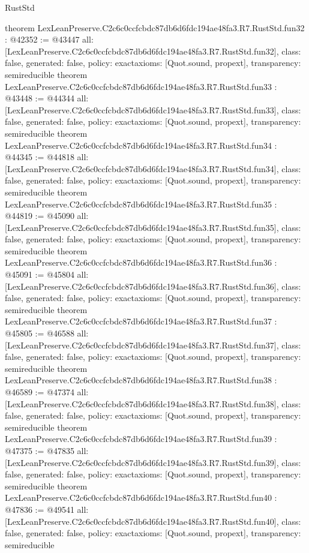 \begin{lexlean}{RustStd}
\begin{coremodule}
{}
theorem LexLeanPreserve.C2c6c0ccfcbdc87db6d6fdc194ae48fa3.R7.RustStd.fun32 : @42352 := @43447 {
  all: [LexLeanPreserve.C2c6c0ccfcbdc87db6d6fdc194ae48fa3.R7.RustStd.fun32],
  class: false,
  generated: false,
  policy: exact{axioms: [Quot.sound, propext]},
  transparency: semireducible
}
theorem LexLeanPreserve.C2c6c0ccfcbdc87db6d6fdc194ae48fa3.R7.RustStd.fun33 : @43448 := @44344 {
  all: [LexLeanPreserve.C2c6c0ccfcbdc87db6d6fdc194ae48fa3.R7.RustStd.fun33],
  class: false,
  generated: false,
  policy: exact{axioms: [Quot.sound, propext]},
  transparency: semireducible
}
theorem LexLeanPreserve.C2c6c0ccfcbdc87db6d6fdc194ae48fa3.R7.RustStd.fun34 : @44345 := @44818 {
  all: [LexLeanPreserve.C2c6c0ccfcbdc87db6d6fdc194ae48fa3.R7.RustStd.fun34],
  class: false,
  generated: false,
  policy: exact{axioms: [Quot.sound, propext]},
  transparency: semireducible
}
theorem LexLeanPreserve.C2c6c0ccfcbdc87db6d6fdc194ae48fa3.R7.RustStd.fun35 : @44819 := @45090 {
  all: [LexLeanPreserve.C2c6c0ccfcbdc87db6d6fdc194ae48fa3.R7.RustStd.fun35],
  class: false,
  generated: false,
  policy: exact{axioms: [Quot.sound, propext]},
  transparency: semireducible
}
theorem LexLeanPreserve.C2c6c0ccfcbdc87db6d6fdc194ae48fa3.R7.RustStd.fun36 : @45091 := @45804 {
  all: [LexLeanPreserve.C2c6c0ccfcbdc87db6d6fdc194ae48fa3.R7.RustStd.fun36],
  class: false,
  generated: false,
  policy: exact{axioms: [Quot.sound, propext]},
  transparency: semireducible
}
theorem LexLeanPreserve.C2c6c0ccfcbdc87db6d6fdc194ae48fa3.R7.RustStd.fun37 : @45805 := @46588 {
  all: [LexLeanPreserve.C2c6c0ccfcbdc87db6d6fdc194ae48fa3.R7.RustStd.fun37],
  class: false,
  generated: false,
  policy: exact{axioms: [Quot.sound, propext]},
  transparency: semireducible
}
theorem LexLeanPreserve.C2c6c0ccfcbdc87db6d6fdc194ae48fa3.R7.RustStd.fun38 : @46589 := @47374 {
  all: [LexLeanPreserve.C2c6c0ccfcbdc87db6d6fdc194ae48fa3.R7.RustStd.fun38],
  class: false,
  generated: false,
  policy: exact{axioms: [Quot.sound, propext]},
  transparency: semireducible
}
theorem LexLeanPreserve.C2c6c0ccfcbdc87db6d6fdc194ae48fa3.R7.RustStd.fun39 : @47375 := @47835 {
  all: [LexLeanPreserve.C2c6c0ccfcbdc87db6d6fdc194ae48fa3.R7.RustStd.fun39],
  class: false,
  generated: false,
  policy: exact{axioms: [Quot.sound, propext]},
  transparency: semireducible
}
theorem LexLeanPreserve.C2c6c0ccfcbdc87db6d6fdc194ae48fa3.R7.RustStd.fun40 : @47836 := @49541 {
  all: [LexLeanPreserve.C2c6c0ccfcbdc87db6d6fdc194ae48fa3.R7.RustStd.fun40],
  class: false,
  generated: false,
  policy: exact{axioms: [Quot.sound, propext]},
  transparency: semireducible
}
\end{coremodule}
\end{lexlean}
